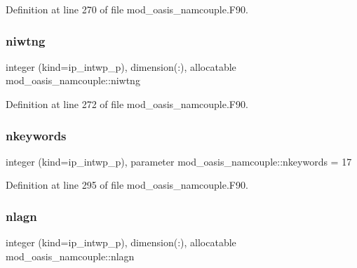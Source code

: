 Definition at line 270 of file mod\+\_\+oasis\+\_\+namcouple.\+F90.

\mbox{\label{namespacemod__oasis__namcouple_a3379333e7d0f24b776c81b1087f3a3b4}} 
\subsubsection{\texorpdfstring{niwtng}{niwtng}}
{\footnotesize\ttfamily integer (kind=ip\+\_\+intwp\+\_\+p), dimension(\+:), allocatable mod\+\_\+oasis\+\_\+namcouple\+::niwtng\hspace{0.3cm}{\ttfamily [private]}}



Definition at line 272 of file mod\+\_\+oasis\+\_\+namcouple.\+F90.

\mbox{\label{namespacemod__oasis__namcouple_ab629bd69885e9cd058f694b00474333a}} 
\subsubsection{\texorpdfstring{nkeywords}{nkeywords}}
{\footnotesize\ttfamily integer (kind=ip\+\_\+intwp\+\_\+p), parameter mod\+\_\+oasis\+\_\+namcouple\+::nkeywords = 17\hspace{0.3cm}{\ttfamily [private]}}



Definition at line 295 of file mod\+\_\+oasis\+\_\+namcouple.\+F90.

\mbox{\label{namespacemod__oasis__namcouple_aad06af35c92de78d71671d39bcbb1690}} 
\subsubsection{\texorpdfstring{nlagn}{nlagn}}
{\footnotesize\ttfamily integer (kind=ip\+\_\+intwp\+\_\+p), dimension(\+:), allocatable mod\+\_\+oasis\+\_\+namcouple\+::nlagn\hspace{0.3cm}{\ttfamily [private]}}



